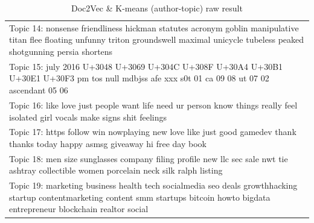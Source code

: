 \documentclass[11pt]{article}
\begin{document}
\begin{appendices}
\begin{table}
\begin{tabular}{|p{\linewidth}|}
    Topic 14: nonsense friendliness hickman statutes acronym goblin manipulative titan flee floating unfunny triton groundswell maximal unicycle tubeless peaked shotgunning persia shortens\\
    Topic 15: july 2016 U+3048 U+3069 U+304C U+308F U+30A4 U+30B1 U+30E1 U+30F3 pm tos null mdbjss afe xxx s0t 01 ca 09 08 ut 07 02 ascendant 05 06\\
    Topic 16: like love just people want life need ur person know things really feel isolated girl vocals make signs shit feelings\\
    Topic 17: https follow win nowplaying new love like just good gamedev thank thanks today happy asmsg giveaway hi free day book\\
    Topic 18: men size sunglasses company filing profile new llc sec sale nwt tie ashtray collectible women porcelain neck silk ralph listing\\
    Topic 19: marketing business health tech socialmedia seo deals growthhacking startup contentmarketing content smm startups bitcoin howto bigdata entrepreneur blockchain realtor social\\
    \hline
    \end{tabular}
	\caption{Doc2Vec \& K-means (author-topic) raw result}
	\label{tb:res_doc_grp_raw}
\end{table}


\end{appendices}
\end{document}
